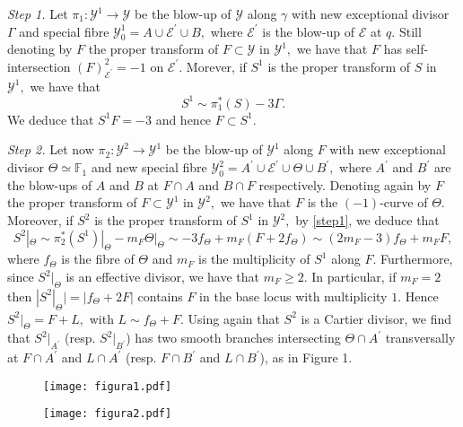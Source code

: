 \documentclass[plain]{amsart}
\begin{document}
{\em Step 1.} Let $\pi_1:\mathcal Y^1\to\mathcal Y$ be the blow-up of $\mathcal Y$ along $\gamma$ 
with new exceptional divisor $\Gamma$ and special fibre $\mathcal Y^1_0=A\cup \mathcal E^\prime\cup B,$
where $\mathcal E^\prime$ is the blow-up of $\mathcal E$ at $q.$
Still denoting by $F$ the proper transform of $F\subset \mathcal Y$ in $\mathcal Y^1,$ we have that
$F$ has self-intersection $(F)^2_{\mathcal E^\prime}=-1$ on $\mathcal E^\prime.$
Morever,  if $S^1$ is the proper transform of $S$ in $\mathcal Y^1,$ we have 
that 
\begin{equation}\label{step1}
S^1\sim \pi_1^*(S)-3\Gamma.  
\end{equation}
We deduce that $S^1F=-3$ and hence $F\subset S^1.$

{\em Step 2.} Let now $\pi_2:\mathcal Y^2\to\mathcal Y^1$ be the blow-up of $\mathcal Y^1$ along $F$
with new exceptional divisor $\Theta\simeq \mathbb F_1$ and new special fibre 
$\mathcal Y^2_0=A^\prime\cup \mathcal E^\prime\cup\Theta\cup B^\prime,$
where $A^\prime$ and $B^\prime$ are the blow-ups of $A$ and $B$ at $F\cap A$ and $B\cap F$ respectively.
Denoting again by $F$ the proper transform of $ F\subset\mathcal Y^1$ in $\mathcal Y^2,$
we have that $F$ is the $(-1)$-curve of $\Theta.$ Moreover,
if $S^2$ is the proper transform of $S^1$
in $\mathcal Y^2,$ by \eqref{step1}, we deduce that 
\begin{equation}\label{step2}
S^2|_{\Theta}\sim\pi^*_2(S^1)|_{\Theta}-m_F\Theta|_{\Theta}
\sim -3f_\Theta+m_F(F+2f_\Theta)\sim (2m_F-3)f_\Theta+m_FF,
\end{equation}
where $f_\Theta$ is the fibre of $\Theta$ and $m_F$ is the multiplicity of $S^1$ along $F.$
Furthermore, since $S^2|_{\Theta}$ is an effective divisor, we have that $m_F\geq 2.$
In particular, if $m_F=2$ then $|S^2|_{\Theta}|=|f_\Theta+2F|$ contains $F$ in the base locus
with multiplicity $1.$ Hence $S^2|_{\Theta}=F+L,$ with $L\sim f_\Theta+F.$ Using again that
$S^2$ is a Cartier divisor, we find that $S^2|_{A^\prime}$ (resp. $S^2|_{B^\prime}$)
has two smooth branches intersecting $\Theta\cap A^\prime$  
transversally at $F\cap A^\prime$ and $L\cap A^\prime$ (resp. $F\cap B^\prime$ and $L\cap B^\prime$), 
as in Figure 1. 
\begin{figure}[htbp]
\noindent
\begin{minipage}[t]{0.50\textwidth}
\texttt{[image: figura1.pdf]}
\caption{}
\end{minipage}
\begin{minipage}[t]{0.47\textwidth}
\texttt{[image: figura2.pdf]}
\caption{}
\end{minipage}\hfill
\end{figure}
\end{document}
